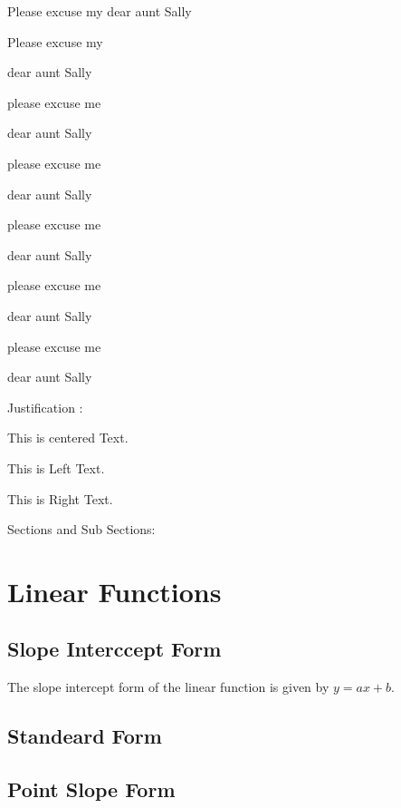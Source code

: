 \documentclass[11pt]{article}
\begin{document}
Please excuse my dear aunt Sally

Please excuse my \begin{large}
dear aunt Sally
\end{large}

please excuse me \begin{Large}
dear aunt Sally
\end{Large}

please excuse me \begin{huge}
dear aunt Sally
\end{huge}

please excuse me \begin{Huge}
dear aunt Sally
\end{Huge}

please excuse me \begin{small}
dear aunt Sally
\end{small}

please excuse me \begin{tiny}
dear aunt Sally
\end{tiny}

Justification : 

\begin{center}
This is centered Text.
\end{center}

\begin{flushleft}
This is Left Text.
\end{flushleft}

\begin{flushright}
This is Right Text.
\end{flushright}

Sections and Sub Sections:

\section{Linear Functions}
	\subsection{Slope Interccept Form}
	The slope intercept form of the linear function is given by $y = ax+b$.
	\subsection{Standeard Form}
	\subsection{Point Slope Form}
\end{document}

